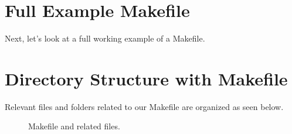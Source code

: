 \section{Full Example Makefile}
\justify{}
Next, let's look at a full working example of a Makefile.

\section{Directory Structure with Makefile}
\justify{}
Relevant files and folders related to our Makefile are organized as seen
below.

\begin{figure}[!htb]
	
	\caption{Makefile and related files.}
\label{makefile}
\end{figure}

